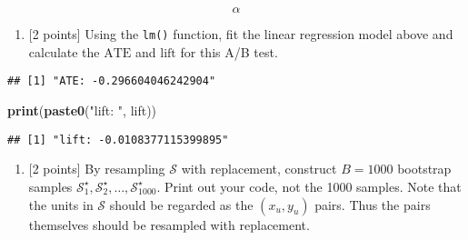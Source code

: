 \documentclass[
]{article}
\newenvironment{Shaded}{\begin{snugshade}}{\end{snugshade}}
\newcommand{\DecValTok}[1]{\textcolor[rgb]{0.00,0.00,0.81}{#1}}
\newcommand{\FunctionTok}[1]{\textcolor[rgb]{0.13,0.29,0.53}{\textbf{#1}}}
\newcommand{\NormalTok}[1]{#1}
\newcommand{\OtherTok}[1]{\textcolor[rgb]{0.56,0.35,0.01}{#1}}
\newcommand{\SpecialCharTok}[1]{\textcolor[rgb]{0.81,0.36,0.00}{\textbf{#1}}}
\newcommand{\StringTok}[1]{\textcolor[rgb]{0.31,0.60,0.02}{#1}}
\providecommand{\tightlist}{%
  \setlength{\itemsep}{0pt}\setlength{\parskip}{0pt}}
\begin{document}
\(\;\)

\[
\hat\alpha
\]

\begin{enumerate}
\def\labelenumi{(\alph{enumi})}
\setcounter{enumi}{1}
\tightlist
\item
  {[}2 points{]} Using the \texttt{lm()} function, fit the linear
  regression model above and calculate the \(\text{ATE}\) and
  \(\text{lift}\) for this A/B test.
\end{enumerate}

\begin{Shaded}
\end{Shaded}

\begin{verbatim}
## [1] "ATE: -0.296604046242904"
\end{verbatim}

\begin{Shaded}
\begin{Highlighting}[]
\FunctionTok{print}\NormalTok{(}\FunctionTok{paste0}\NormalTok{(}\StringTok{"lift: "}\NormalTok{, lift))}
\end{Highlighting}
\end{Shaded}

\begin{verbatim}
## [1] "lift: -0.0108377115399895"
\end{verbatim}

\begin{enumerate}
\def\labelenumi{(\alph{enumi})}
\setcounter{enumi}{2}
\tightlist
\item
  {[}2 points{]} By resampling \(\mathcal{S}\) with replacement,
  construct \(B=1000\) bootstrap samples
  \(\mathcal{S}_1^\star,\mathcal{S}_2^\star,\ldots,\mathcal{S}_{1000}^\star\).
  Print out your code, not the 1000 samples. Note that the units in
  \(\mathcal{S}\) should be regarded as the \((x_u,y_u)\) pairs. Thus
  the pairs themselves should be resampled with replacement.
\end{enumerate}
\end{document}
